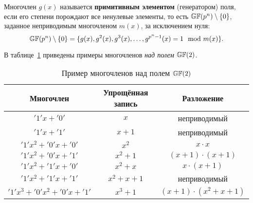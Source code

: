 Многочлен $g(x)$ называется \textbf{примитивным элементом} (генератором) поля, если его степени порождают все ненулевые элементы, то есть $\mathbb{GF}(p^n) \setminus \{0\}$, заданное неприводимым многочленом $m(x)$, за исключением нуля:
    \[ \mathbb{GF}(p^n) \setminus \{0\} = \{ g(x), g^2(x), g^3(x), \dots, g^{p^n-1}(x) = 1 \mod m(x) \}. \]

\example
В таблице~\ref{tab:irreducible-gf2} приведены примеры многочленов \emph{над полем} $\mathbb{GF}(2)$.
\begin{table}[!ht]
    \centering
    \caption{Пример многочленов над полем $\mathbb{GF}(2)$\label{tab:irreducible-gf2}}
    \begin{tabular}{|c|c|c|}
        \hline
        Многочлен & \parbox{2.5cm}{Упрощённая запись} & Разложение \\
        \hline
        $'1' x + '0'$ & $x$ & неприводимый \\
        $'1' x + '1'$ & $x+1$ & неприводимый \\
        $'1' x^2 + '0' x + '0'$ & $x^2$ & $x \cdot x$ \\
        $'1' x^2 + '0'x + '1'$ & $x^2 + 1$ & $(x+1) \cdot (x+1)$ \\
        $'1' x^2 + '1' x + '0'$ & $x^2 + x$ & $x \cdot (x+1)$ \\
        $'1' x^2 + '1' x + '1'$ & $x^2 + x + 1$ & неприводимый \\
        $'1' x^3 + '0' x^2 + '0' x + '1'$ & $x^3 + 1$ & $(x+1) \cdot (x^2+x+1)$ \\
        \hline
    \end{tabular}
\end{table}
\exampleend
